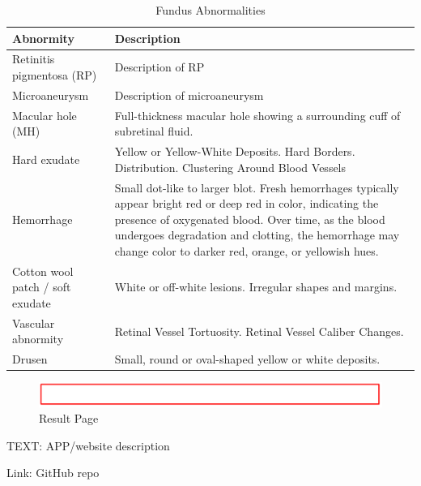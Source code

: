 \documentclass{article}
\begin{document}
	{
		\fontsize{9}{12}\selectfont
		{
			\begin{longtable}{lp{3.8in}}
				\caption{Fundus Abnormalities}
				\label{tb:fundus-ab}\\
				\toprule
				Abnormity&Description\\
				\toprule
				
				\multicolumn{1}{l}{Retinitis pigmentosa (RP)}
				& Description of RP\\
				
				\multicolumn{1}{l}{Microaneurysm}
				& Description of microaneurysm\\
				
				\multicolumn{1}{l}{Macular hole (MH)} & Full-thickness macular hole showing a surrounding cuff of subretinal fluid.\\
				
				\multicolumn{1}{l}{Hard exudate} & Yellow or Yellow-White Deposits. Hard Borders. Distribution. Clustering Around Blood Vessels\\
				
				\multicolumn{1}{l}{Hemorrhage} & Small dot-like to larger blot. Fresh hemorrhages typically appear bright red or deep red in color, indicating the presence of oxygenated blood. Over time, as the blood undergoes degradation and clotting, the hemorrhage may change color to darker red, orange, or yellowish hues.\\
				
				\multicolumn{1}{l}{Cotton wool patch / soft exudate} & White or off-white lesions. Irregular shapes and margins.\\
				
				\multicolumn{1}{l}{Vascular abnormity} & Retinal Vessel Tortuosity. Retinal Vessel Caliber Changes. \\
				
				\multicolumn{1}{l}{Drusen} & Small, round or oval-shaped yellow or white deposits.\\
				
				\bottomrule
			\end{longtable}
		}
	}
	
	
	\begin{figure}[htbp]
		\centering
		\includegraphics[width=\linewidth]{Figs/Temp.png}
		\caption{Result Page}
		\vspace{0.3cm}
		\label{fig:result_page}
	\end{figure}
	
	TEXT: APP/website description
	
	Link: GitHub repo
	
\end{document}
